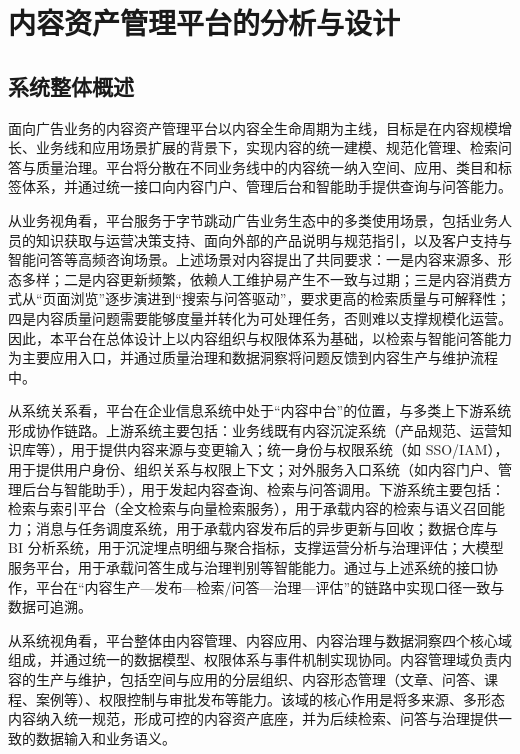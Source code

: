
\chapter{内容资产管理平台的分析与设计}
\section{系统整体概述}

面向广告业务的内容资产管理平台以内容全生命周期为主线，目标是在内容规模增长、业务线和应用场景扩展的背景下，实现内容的统一建模、规范化管理、检索问答与质量治理。平台将分散在不同业务线中的内容统一纳入空间、应用、类目和标签体系，并通过统一接口向内容门户、管理后台和智能助手提供查询与问答能力。

从业务视角看，平台服务于字节跳动广告业务生态中的多类使用场景，包括业务人员的知识获取与运营决策支持、面向外部的产品说明与规范指引，以及客户支持与智能问答等高频咨询场景。上述场景对内容提出了共同要求：一是内容来源多、形态多样；二是内容更新频繁，依赖人工维护易产生不一致与过期；三是内容消费方式从“页面浏览”逐步演进到“搜索与问答驱动”，要求更高的检索质量与可解释性；四是内容质量问题需要能够度量并转化为可处理任务，否则难以支撑规模化运营\cite{sillaber2019experience,mahanti2019data}。因此，本平台在总体设计上以内容组织与权限体系为基础，以检索与智能问答能力为主要应用入口，并通过质量治理和数据洞察将问题反馈到内容生产与维护流程中。

从系统关系看，平台在企业信息系统中处于“内容中台”的位置，与多类上下游系统形成协作链路。上游系统主要包括：业务线既有内容沉淀系统（产品规范、运营知识库等），用于提供内容来源与变更输入；统一身份与权限系统（如 SSO/IAM），用于提供用户身份、组织关系与权限上下文；对外服务入口系统（如内容门户、管理后台与智能助手），用于发起内容查询、检索与问答调用。下游系统主要包括：检索与索引平台（全文检索与向量检索服务），用于承载内容的检索与语义召回能力；消息与任务调度系统，用于承载内容发布后的异步更新与回收；数据仓库与 BI 分析系统，用于沉淀埋点明细与聚合指标，支撑运营分析与治理评估；大模型服务平台，用于承载问答生成与治理判别等智能能力。通过与上述系统的接口协作，平台在“内容生产—发布—检索/问答—治理—评估”的链路中实现口径一致与数据可追溯。

从系统视角看，平台整体由内容管理、内容应用、内容治理与数据洞察四个核心域组成，并通过统一的数据模型、权限体系与事件机制实现协同。内容管理域负责内容的生产与维护，包括空间与应用的分层组织、内容形态管理（文章、问答、课程、案例等）、权限控制与审批发布等能力。该域的核心作用是将多来源、多形态内容纳入统一规范，形成可控的内容资产底座，并为后续检索、问答与治理提供一致的数据输入和业务语义\cite{maican2016system}。

